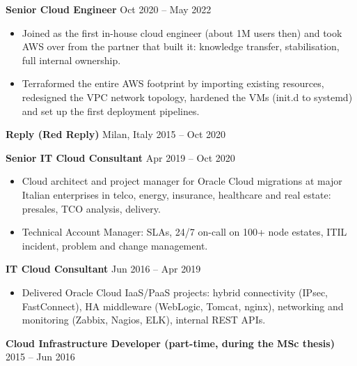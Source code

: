 \documentclass[10pt,a4paper]{article}
\newcommand{\company}[3]{%
  \needspace{9\baselineskip}%
  {\large\bfseries\color{accent}#1}\;\textcolor{muted}{\textbullet{} #2} \hfill \textcolor{muted}{#3}\par\vspace{2pt}
}
\newcommand{\role}[2]{%
  \needspace{6\baselineskip}%
  \vspace{2pt}\textbf{#1} \hfill \textcolor{muted}{#2}\par
}
\begin{document}
\role{Senior Cloud Engineer}{Oct 2020 -- May 2022}
\begin{itemize}
  \item Joined as the first in-house cloud engineer (about 1M users then) and took AWS over from the partner that built it: knowledge transfer, stabilisation, full internal ownership.
  \item Terraformed the entire AWS footprint by importing existing resources, redesigned the VPC network topology, hardened the VMs (init.d to systemd) and set up the first deployment pipelines.
\end{itemize}

\company{Reply (Red Reply)}{Milan, Italy}{2015 -- Oct 2020}

\role{Senior IT Cloud Consultant}{Apr 2019 -- Oct 2020}
\begin{itemize}
  \item Cloud architect and project manager for Oracle Cloud migrations at major Italian enterprises in telco, energy, insurance, healthcare and real estate: presales, TCO analysis, delivery.
  \item Technical Account Manager: SLAs, 24/7 on-call on 100+ node estates, ITIL incident, problem and change management.
\end{itemize}

\role{IT Cloud Consultant}{Jun 2016 -- Apr 2019}
\begin{itemize}
  \item Delivered Oracle Cloud IaaS/PaaS projects: hybrid connectivity (IPsec, FastConnect), HA middleware (WebLogic, Tomcat, nginx), networking and monitoring (Zabbix, Nagios, ELK), internal REST APIs.
\end{itemize}

\role{Cloud Infrastructure Developer (part-time, during the MSc thesis)}{2015 -- Jun 2016}

\end{document}
